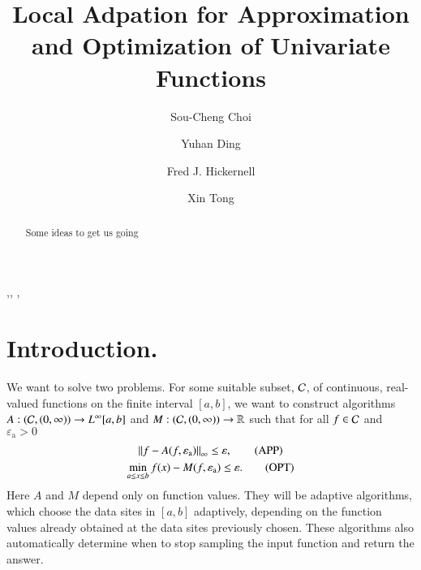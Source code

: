 \documentclass[review]{elsarticle}
\newcommand{\abstol}{\varepsilon_{\textrm{a}}}
\begin{document}
\begin{frontmatter}

\title{Local Adpation for Approximation and Optimization of Univariate Functions}


\author{Sou-Cheng Choi}
\author{Yuhan Ding}
\author{Fred J. Hickernell}
\author{Xin Tong}
\address{Department of Applied Mathematics, Illinois Institute of Technology, RE 208, 10 West 32$^{\text{nd}}$ Street, Chicago, Illinois, 60616, USA}

\begin{abstract}
Some ideas to get us going
\end{abstract}

\begin{keyword}
\sep \sep
\MSC[2010]  \sep
\end{keyword}

\end{frontmatter}

\section{Introduction.}

We want to solve two problems.  For some suitable subset, $\mathcal{C}$, of continuous, real-valued functions on the finite interval $[a,b]$, we want to construct  algorithms $A:(\mathcal{C},(0,\infty)) \to L^{\infty}[a,b]$ and $M: (\mathcal{C},(0,\infty)) \to \mathbb{R}$ such that for all $f \in \mathcal{C}$ and $\abstol > 0$
\begin{gather}
\norm[\infty]{f - A(f,\abstol)} \le \varepsilon,  \tag{APP} \\
\min_{a \le x \le b} f(x) - M(f,\abstol) \le \varepsilon. \tag{OPT}
\end{gather}
Here $A$ and $M$ depend only on function values.  They will be adaptive algorithms, which choose the data sites in $[a,b]$ adaptively, depending on the function values already obtained at the data sites previously chosen.  These algorithms also automatically determine when to stop sampling the input function and return the answer.
\end{document}
